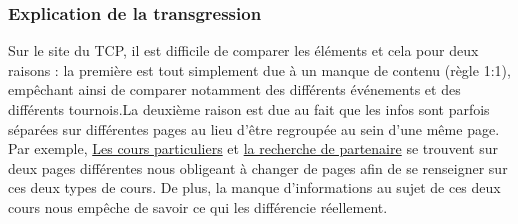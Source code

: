 \documentclass{article}[12pt]
\begin{document}
    \subsubsection*{Explication de la transgression}
    Sur le site du TCP, il est difficile de comparer les éléments et cela pour deux raisons : la première est tout simplement due à un manque de contenu (règle 1:1), empêchant ainsi de comparer notamment des différents événements et des différents tournois.La deuxième raison est due au fait que les infos sont parfois séparées sur différentes pages au lieu d'être regroupée au sein d'une même page.
    \newline
    \newline
    Par exemple, \href{http://www.tennisclubdeparis.fr/lecons-particulieres.html}{Les cours particuliers} et \href{http://www.tennisclubdeparis.fr/page168.html}{la recherche de partenaire} se trouvent sur deux pages différentes nous obligeant à changer de pages afin de se renseigner sur ces deux types de cours. De plus, la manque d'informations au sujet de ces deux cours nous empêche de savoir ce qui les différencie réellement.
\end{document}
